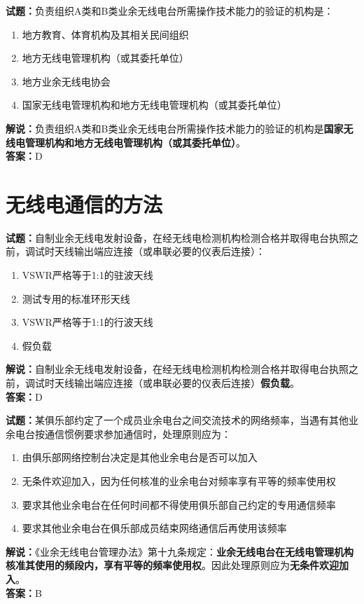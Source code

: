 \documentclass{ctexbook}
\begin{document}
\vspace{1em}

\textbf{试题：}负责组织A类和B类业余无线电台所需操作技术能力的验证的机构是：
\begin{enumerate}[leftmargin=3em]
  \item 地方教育、体育机构及其相关民间组织
  \item 地方无线电管理机构（或其委托单位）
  \item 地方业余无线电协会
  \item 国家无线电管理机构和地方无线电管理机构（或其委托单位）
\end{enumerate}
\noindent\textbf{解说：}负责组织A类和B类业余无线电台所需操作技术能力的验证的机构是\textbf{国家无线电管理机构和地方无线电管理机构（或其委托单位）}。\\\noindent\textbf{答案：}D



\chapter{无线电通信的方法}

\newpage

\textbf{试题：}自制业余无线电发射设备，在经无线电检测机构检测合格并取得电台执照之前，调试时天线输出端应连接（或串联必要的仪表后连接）：
\begin{enumerate}[leftmargin=3em]
  \item VSWR严格等于1:1的驻波天线
  \item 测试专用的标准环形天线
  \item VSWR严格等于1:1的行波天线
  \item 假负载
\end{enumerate}
\noindent\textbf{解说：}自制业余无线电发射设备，在经无线电检测机构检测合格并取得电台执照之前，调试时天线输出端应连接（或串联必要的仪表后连接）\textbf{假负载}。\\\noindent\textbf{答案：}D

\vspace{1em}

\textbf{试题：}某俱乐部约定了一个成员业余电台之间交流技术的网络频率，当遇有其他业余电台按通信惯例要求参加通信时，处理原则应为：
\begin{enumerate}[leftmargin=3em]
  \item 由俱乐部网络控制台决定是其他业余电台是否可以加入
  \item 无条件欢迎加入，因为任何核准的业余电台对频率享有平等的频率使用权
  \item 要求其他业余电台在任何时间都不得使用俱乐部自己约定的专用通信频率
  \item 要求其他业余电台在俱乐部成员结束网络通信后再使用该频率
\end{enumerate}
\noindent\textbf{解说：}《业余无线电台管理办法》第十九条规定：\textbf{业余无线电台在无线电管理机构核准其使用的频段内，享有平等的频率使用权}。因此处理原则应为\textbf{无条件欢迎加入}。\\\noindent\textbf{答案：}B
\end{document}
